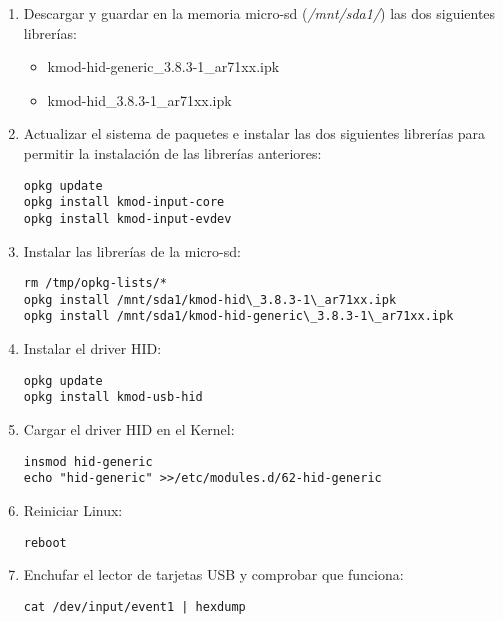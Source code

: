 \begin{enumerate}
	
	\item Descargar y guardar en la memoria micro-sd (\emph{/mnt/sda1/}) las dos siguientes librerías:

		\begin{itemize}
			\item kmod-hid-generic\_3.8.3-1\_ar71xx.ipk
			\item kmod-hid\_3.8.3-1\_ar71xx.ipk
		\end{itemize}

	\item Actualizar el sistema de paquetes e instalar las dos siguientes librerías para permitir la instalación de las librerías anteriores:

		\begin{lstlisting}
opkg update
opkg install kmod-input-core
opkg install kmod-input-evdev
		\end{lstlisting}

	\item Instalar las librerías de la micro-sd:

		\begin{lstlisting}
rm /tmp/opkg-lists/*
opkg install /mnt/sda1/kmod-hid\_3.8.3-1\_ar71xx.ipk
opkg install /mnt/sda1/kmod-hid-generic\_3.8.3-1\_ar71xx.ipk
		\end{lstlisting}

	\item Instalar el driver HID:

		\begin{lstlisting}
opkg update
opkg install kmod-usb-hid
		\end{lstlisting}

	\item Cargar el driver HID en el Kernel:

		\begin{lstlisting}
insmod hid-generic
echo "hid-generic" >>/etc/modules.d/62-hid-generic
		\end{lstlisting}

	\item Reiniciar Linux:

		\begin{lstlisting}
reboot
		\end{lstlisting}

	\item Enchufar el lector de tarjetas USB y comprobar que funciona:

		\begin{lstlisting}
cat /dev/input/event1 | hexdump
		\end{lstlisting}

\end{enumerate}

